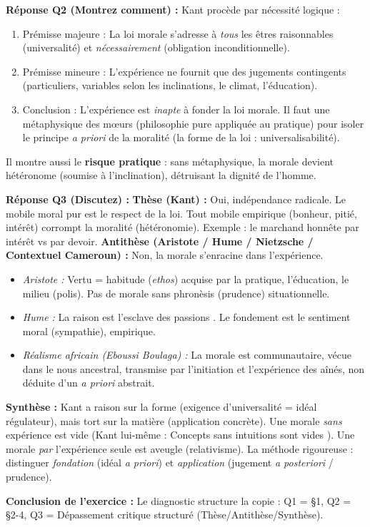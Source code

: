 \documentclass[11pt]{article}
\newcommand{\cle}[1]{{\popxbold\color{popdark}#1}}
\begin{document}
\begin{exoresolu}
\textbf{Réponse Q2 (Montrez comment) :}
Kant procède par \cle{nécessité logique} :
\begin{enumerate}
    \item Prémisse majeure : La loi morale s'adresse à \emph{tous} les êtres raisonnables (universalité) et \emph{nécessairement} (obligation inconditionnelle).
    \item Prémisse mineure : L'expérience ne fournit que des jugements contingents (particuliers, variables selon les inclinations, le climat, l'éducation).
    \item Conclusion : L'expérience est \emph{inapte} à fonder la loi morale. Il faut une \cle{métaphysique des mœurs} (philosophie pure appliquée au pratique) pour isoler le principe \emph{a priori} de la moralité (la forme de la loi : universalisabilité).
\end{enumerate}
Il montre aussi le \textbf{risque pratique} : sans métaphysique, la morale devient \cle{hétéronome} (soumise à l'inclination), détruisant la \cle{dignité} de l'homme.

\textbf{Réponse Q3 (Discutez) :}
\textbf{Thèse (Kant) :} Oui, indépendance radicale. Le mobile moral pur est le \cle{respect de la loi}. Tout mobile empirique (bonheur, pitié, intérêt) corrompt la moralité (hétéronomie). Exemple : le marchand honnête par intérêt vs par devoir.
\textbf{Antithèse (Aristote / Hume / Nietzsche / Contextuel Cameroun) :} Non, la morale s'enracine dans l'expérience.
\begin{itemize}
    \item \emph{Aristote :} Vertu = habitude (\emph{ethos}) acquise par la pratique, l'éducation, le milieu (polis). Pas de morale sans \cle{phronèsis} (prudence) situationnelle.
    \item \emph{Hume :} La raison est \og l'esclave des passions \fg. Le fondement est le \cle{sentiment moral} (sympathie), empirique.
    \item \emph{Réalisme africain (Eboussi Boulaga) :} La morale est \cle{communautaire}, vécue dans le \og nous \fg ancestral, transmise par l'initiation et l'expérience des aînés, non déduite d'un \emph{a priori} abstrait.
\end{itemize}
\textbf{Synthèse :} Kant a raison sur la \cle{forme} (exigence d'universalité = idéal régulateur), mais tort sur la \cle{matière} (application concrète). Une morale \emph{sans} expérience est \og vide \fg (Kant lui-même : \og Concepts sans intuitions sont vides \fg). Une morale \emph{par} l'expérience seule est \og aveugle \fg (relativisme). La \cle{méthode} rigoureuse : distinguer \emph{fondation} (idéal \emph{a priori}) et \emph{application} (jugement \emph{a posteriori} / prudence).

\textbf{Conclusion de l'exercice :} Le diagnostic structure la copie : Q1 = §1, Q2 = §2-4, Q3 = Dépassement critique structuré (Thèse/Antithèse/Synthèse).
\end{exoresolu}
\end{document}
